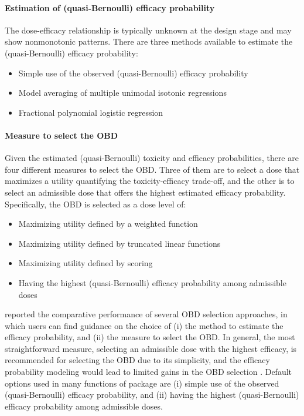 \paragraph{Estimation of (quasi-Bernoulli) efficacy probability} The dose-efficacy relationship is typically unknown at the design stage and may show nonmonotonic patterns. There are three methods available to estimate the (quasi-Bernoulli) efficacy probability:
\begin{itemize}
\item Simple use of the observed (quasi-Bernoulli) efficacy probability
\item Model averaging of multiple unimodal isotonic regressions \citep{lin:2017}
\item Fractional polynomial logistic regression \citep{takeda:2018}
\end{itemize}

\paragraph{Measure to select the OBD}
Given the estimated (quasi-Bernoulli) toxicity and efficacy probabilities, there are four different measures to select the OBD. Three of them are to select a dose that maximizes a utility quantifying the toxicity-efficacy trade-off, and the other is to select an admissible dose that offers the highest estimated efficacy probability. Specifically, the OBD is selected as a dose level of:
\begin{itemize}
\item Maximizing utility defined by a weighted function \citep{lin:2017,zhou:2019}
\item Maximizing utility defined by truncated linear functions \citep{li:2020,lin:2021}
\item Maximizing utility defined by scoring \citep{lin:2020b}
\item Having the highest (quasi-Bernoulli) efficacy probability among admissible doses \citep{takeda:2018}
\end{itemize}

\citet{yamaguchi:2024} reported the comparative performance of several OBD selection approaches, in which users can find guidance on the choice of (i) the method to estimate the efficacy probability, and (ii) the measure to select the OBD. In general, the most straightforward measure, selecting an admissible dose with the highest efficacy, is recommended for selecting the OBD due to its simplicity, and the efficacy probability modeling would lead to limited gains in the OBD selection \citep{yamaguchi:2024}. Default options used in many functions of  package are (i) simple use of the observed (quasi-Bernoulli) efficacy probability, and (ii) having the highest (quasi-Bernoulli) efficacy probability among admissible doses.

